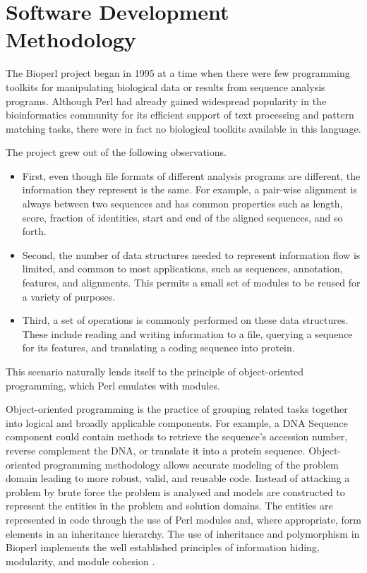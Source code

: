 \documentclass[12pt]{article}
\begin{document}
\section{Software Development Methodology}

The Bioperl project began in 1995 \cite{chervitz-bits} at a time when
there were few programming toolkits for manipulating biological data
or results from sequence analysis programs.  Although Perl had already
gained widespread popularity in the bioinformatics community for its
efficient support of text processing and pattern matching tasks, there
were in fact no biological toolkits available in this language.

The project grew out of the following observations.  
\begin{itemize}

\item First, even though file formats of different analysis programs
are different, the information they represent is the same.  For
example, a pair-wise alignment is always between two sequences and has
common properties such as length, score, fraction of identities, start
and end of the aligned sequences, and so forth.

\item Second, the number of data structures needed to represent
information flow is limited, and common to most applications, such as
sequences, annotation, features, and alignments.  This permits a 
small set of modules to be reused for a variety of purposes.

\item Third, a set of operations is commonly performed on these data
structures.  These include reading and writing information to a file,
querying a sequence for its features, and translating a coding
sequence into protein.

\end{itemize}

This scenario naturally lends itself to the principle of
object-oriented programming, which Perl emulates with modules.

Object-oriented programming is the practice of grouping related tasks
together into logical and broadly applicable components.  For example,
a DNA Sequence component could contain methods to retrieve the
sequence's accession number, reverse complement the DNA, or translate
it into a protein sequence.  Object-oriented programming methodology
allows accurate modeling of the problem domain leading to more
robust, valid, and reusable code. Instead of attacking a problem by
brute force the problem is analysed and models are constructed to
represent the entities in the problem and solution domains. The
entities are represented in code through the use of Perl modules and,
where appropriate, form elements in an inheritance hierarchy.  The use
of inheritance and polymorphism in Bioperl implements the well
established principles of information hiding, modularity, and module
cohesion \cite{tremblay}.
\end{document}
